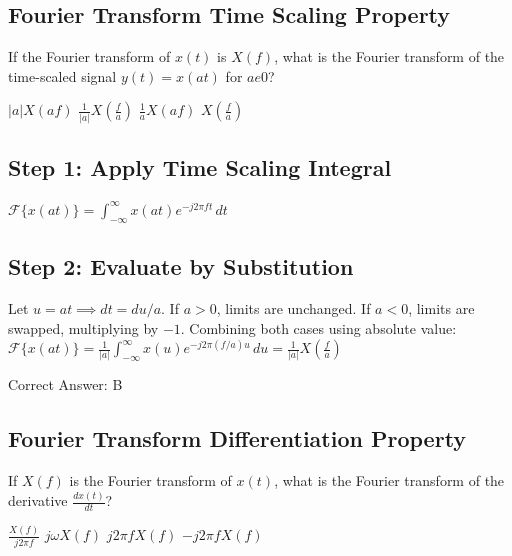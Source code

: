 \clearpage

\subsection{Fourier Transform Time Scaling Property}

If the Fourier transform of $x(t)$ is $X(f)$, what is the Fourier transform of the time-scaled signal $y(t) = x(a t)$ for $a 

e 0$?

\begin{choices}
    \choice $|a| X(a f)$
    \correctchoice $\frac{1}{|a|} X\left(\frac{f}{a}\right)$
    \choice $\frac{1}{a} X(a f)$
    \choice $X\left(\frac{f}{a}\right)$
\end{choices}

\begin{solution}

\subsection*{Step 1: Apply Time Scaling Integral}
$\mathcal{F}\{x(at)\} = \int_{-\infty}^{\infty} x(at) e^{-j 2\pi f t}\, dt$

\subsection*{Step 2: Evaluate by Substitution}
Let $u = at \implies dt = du/a$. If $a > 0$, limits are unchanged. If $a < 0$, limits are swapped, multiplying by $-1$. Combining both cases using absolute value:
$\mathcal{F}\{x(at)\} = \frac{1}{|a|} \int_{-\infty}^{\infty} x(u) e^{-j 2\pi (f/a) u}\, du = \frac{1}{|a|} X\left(\frac{f}{a}\right)$

Correct Answer: B
\end{solution}

\clearpage

\subsection{Fourier Transform Differentiation Property}

If $X(f)$ is the Fourier transform of $x(t)$, what is the Fourier transform of the derivative $\frac{dx(t)}{dt}$?

\begin{choices}
    \choice $\frac{X(f)}{j 2\pi f}$
    \choice $j\omega X(f)$
    \correctchoice $j 2\pi f X(f)$
    \choice $-j 2\pi f X(f)$
\end{choices}

